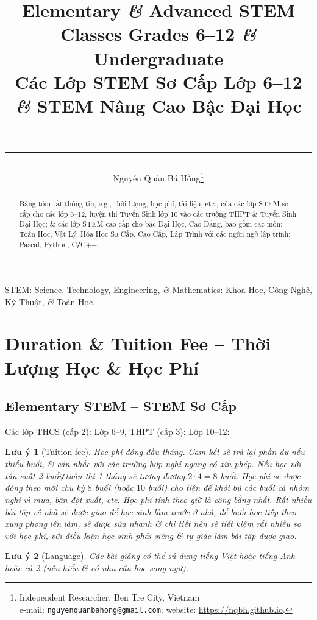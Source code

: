 \documentclass{article}
\title{Elementary {\it\&} Advanced STEM Classes Grades 6--12 {\it\&} Undergraduate\\Các Lớp STEM Sơ Cấp Lớp 6--12 {\it\&} STEM Nâng Cao Bậc Đại Học\\\vspace{2mm}\hrule\vspace{2mm}{\sf Mathematics, Physics, Chemistry, Programming: Pascal, Python, C{\tt/}C++\\Toán Học, Vật Lý, Hóa Học, Lập Trình: Pascal, Python, C{\tt/}C++}\vspace{2mm}\hrule}
\author{Nguyễn Quản Bá Hồng\footnote{Independent Researcher, Ben Tre City, Vietnam\\e-mail: \texttt{nguyenquanbahong@gmail.com}; website: \url{https://nqbh.github.io}.}}
\date{\vspace{-1cm}}
\numberwithin{equation}{section}
\newtheorem{luuy}{Lưu ý}
\begin{document}
\maketitle
\begin{abstract}
	Bảng tóm tắt thông tin, e.g., thời lượng, học phí, tài liệu, etc., của các lớp STEM sơ cấp cho các lớp 6--12, luyện thi Tuyển Sinh lớp 10 vào các trường THPT \& Tuyển Sinh Đại Học; \& các lớp STEM cao cấp cho bậc Đại Học, Cao Đẳng, bao gồm các môn: Toán Học, Vật Lý, Hóa Học Sơ Cấp, Cao Cấp, Lập Trình với các ngôn ngữ lập trình: Pascal, Python, C{\tt/}C++.
\end{abstract}
{\sf STEM: Science, Technology, Engineering, {\it\&} Mathematics: Khoa Học, Công Nghệ, Kỹ Thuật, {\it\&} Toán Học.}
\setcounter{secnumdepth}{4}
\setcounter{tocdepth}{3}


\section{Duration \& Tuition Fee -- Thời Lượng Học \& Học Phí}

\subsection{Elementary STEM -- STEM Sơ Cấp}
Các lớp THCS (cấp 2): Lớp 6--9, THPT (cấp 3): Lớp 10--12:

\begin{luuy}[Tuition fee]
	Học phí đóng đầu tháng. Cam kết sẽ trả lại phần dư nếu thiếu buổi, \& cân nhắc với các trường hợp nghỉ ngang có xin phép. Nếu học với tần suất 2 buổi{\tt/}tuần thì 1 tháng sẽ tương đương $2\cdot4 = 8$ buổi. Học phí sẽ được đóng theo mỗi chu kỳ $8$ buổi (hoặc $10$ buổi) cho tiện để khỏi bù các buổi cả nhóm nghỉ vì mưa, bận đột xuất, etc. Học phí tính theo giờ là công bằng nhất. Rất nhiều bài tập về nhà sẽ được giao để học sinh làm trước ở nhà, để buổi học tiếp theo xung phong lên làm, sẽ được sửa nhanh \& chi tiết nên sẽ tiết kiệm rất nhiều so với học phí, với điều kiện học sinh phải siêng \& tự giác làm bài tập được giao.
\end{luuy}

\begin{luuy}[Language]
	Các bài giảng có thể sử dụng tiếng Việt hoặc tiếng Anh hoặc cả 2 (nếu hiểu \& có nhu cầu học song ngữ).
\end{luuy}
\end{document}
